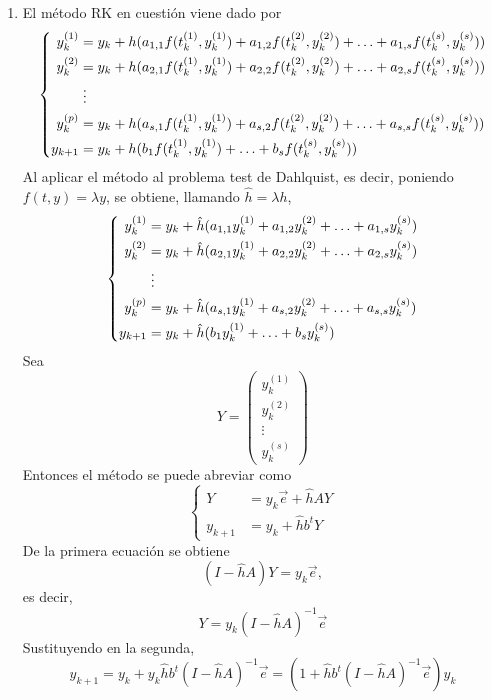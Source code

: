 \documentclass[11pt]{report}
\begin{document}
\begin{enumerate}
    \item El método RK en cuestión viene dado por 
    \[\left\{\begin{alignedat}{1}
    y_k^{(1)} &= y_k+h(a_{1,1}f(t_k^{(1)},y_k^{(1)})+a_{1,2}f(t_k^{(2)},y_k^{(2)})+\mathellipsis+a_{1,s}f(t_k^{(s)},y_k^{(s)})) \\
    y_k^{(2)} &= y_k+h(a_{2,1}f(t_k^{(1)},y_k^{(1)})+a_{2,2}f(t_k^{(2)},y_k^{(2)})+\mathellipsis+a_{2,s}f(t_k^{(s)},y_k^{(s)})) \\
    &\phantom{\vdots} \vdots \\
    y_k^{(p)} &= y_k+h(a_{s,1}f(t_k^{(1)},y_k^{(1)})+a_{s,2}f(t_k^{(2)},y_k^{(2)})+\mathellipsis+a_{s,s}f(t_k^{(s)},y_k^{(s)})) \\
    y_{k+1} &= y_k+h(b_1f(t_k^{(1)},y_k^{(1)})+\mathellipsis+b_sf(t_k^{(s)},y_k^{(s)}))
    \end{alignedat}\right.\]
    Al aplicar el método al problema test de Dahlquist, es decir, poniendo $f(t,y)=\lambda y$, se obtiene, llamando $\hat{h}=\lambda h$,
    \[\left\{\begin{alignedat}{1}
        y_k^{(1)} &= y_k+\hat{h}(a_{1,1}y_k^{(1)}+a_{1,2}y_k^{(2)}+\mathellipsis+a_{1,s}y_k^{(s)}) \\
        y_k^{(2)} &= y_k+\hat{h}(a_{2,1}y_k^{(1)}+a_{2,2}y_k^{(2)}+\mathellipsis+a_{2,s}y_k^{(s)}) \\
        &\phantom{\vdots} \vdots \\
        y_k^{(p)} &= y_k+\hat{h}(a_{s,1}y_k^{(1)}+a_{s,2}y_k^{(2)}+\mathellipsis+a_{s,s}y_k^{(s)}) \\
        y_{k+1} &= y_k+\hat{h}(b_1y_k^{(1)}+\mathellipsis+b_sy_k^{(s)})
        \end{alignedat}\right.\]
    Sea 
\[Y = \left(\begin{array}{c}
    y_k^{(1)} \\
    y_k^{(2)} \\
    \vdots \\
    y_k^{(s)}
\end{array}\right)\]
Entonces el método se puede abreviar como
\[\left\{\begin{alignedat}{1}
    Y &= y_k\vec{e}+\hat{h}AY \\
    y_{k+1} &= y_k+\hat{h}b^tY
    \end{alignedat}\right.\]
De la primera ecuación se obtiene
\[(I-\hat{h}A)Y = y_k\vec{e}, \]
es decir,
\[Y = y_k(I-\hat{h}A)^{-1}\vec{e}\]
Sustituyendo en la segunda,
\[y_{k+1}=y_k+y_k\hat{h}b^t(I-\hat{h}A)^{-1}\vec{e} = (1+\hat{h}b^t(I-\hat{h}A)^{-1}\vec{e})y_k\]

\end{enumerate}
\end{document}
